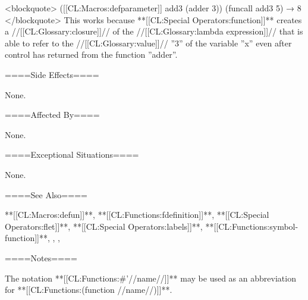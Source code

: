 <blockquote> ([[CL:Macros:defparameter]] add3 (adder 3)) (funcall add3 5) → 8 </blockquote> This works because **[[CL:Special Operators:function]]** creates a //[[CL:Glossary:closure]]// of the //[[CL:Glossary:lambda expression]]// that is able to refer to the //[[CL:Glossary:value]]// ''3'' of the variable ''x'' even after control has returned from the function ''adder''.

====Side Effects====

None.

====Affected By====

None.

====Exceptional Situations====

None.

====See Also====

**[[CL:Macros:defun]]**, **[[CL:Functions:fdefinition]]**, **[[CL:Special Operators:flet]]**, **[[CL:Special Operators:labels]]**, **[[CL:Functions:symbol-function]]**, {\secref\SymbolsAsForms}, {\secref\SharpsignQuote}, {\secref\PrintingOtherObjects}

====Notes====

The notation **[[CL:Functions:#'//name//]]** may be used as an abbreviation for **[[CL:Functions:(function //name//)]]**.

 
